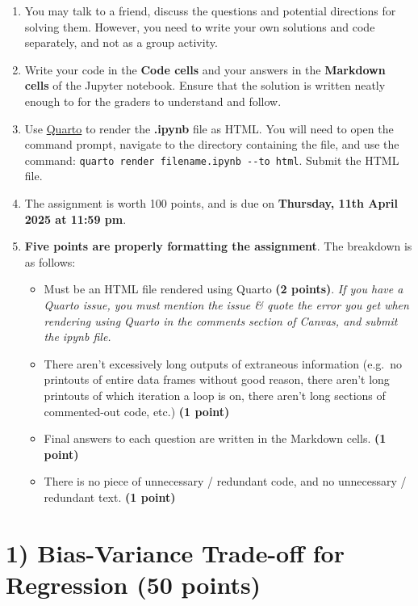 \documentclass[
  letterpaper,
  DIV=11,
  numbers=noendperiod]{scrreprt}
\providecommand{\tightlist}{%
  \setlength{\itemsep}{0pt}\setlength{\parskip}{0pt}}\usepackage{longtable,booktabs,array}
\begin{document}
\begin{enumerate}
\def\labelenumi{\arabic{enumi}.}
\item
  You may talk to a friend, discuss the questions and potential
  directions for solving them. However, you need to write your own
  solutions and code separately, and not as a group activity.
\item
  Write your code in the \textbf{Code cells} and your answers in the
  \textbf{Markdown cells} of the Jupyter notebook. Ensure that the
  solution is written neatly enough to for the graders to understand and
  follow.
\item
  Use
  \href{https://quarto.org/docs/output-formats/html-basics.html}{Quarto}
  to render the \textbf{.ipynb} file as HTML. You will need to open the
  command prompt, navigate to the directory containing the file, and use
  the command: \texttt{quarto\ render\ filename.ipynb\ -\/-to\ html}.
  Submit the HTML file.
\item
  The assignment is worth 100 points, and is due on \textbf{Thursday,
  11th April 2025 at 11:59 pm}.
\item
  \textbf{Five points are properly formatting the assignment}. The
  breakdown is as follows:

  \begin{itemize}
  \tightlist
  \item
    Must be an HTML file rendered using Quarto \textbf{(2 points)}.
    \emph{If you have a Quarto issue, you must mention the issue \&
    quote the error you get when rendering using Quarto in the comments
    section of Canvas, and submit the ipynb file.}
  \item
    There aren't excessively long outputs of extraneous information
    (e.g.~no printouts of entire data frames without good reason, there
    aren't long printouts of which iteration a loop is on, there aren't
    long sections of commented-out code, etc.) \textbf{(1 point)}
  \item
    Final answers to each question are written in the Markdown cells.
    \textbf{(1 point)}
  \item
    There is no piece of unnecessary / redundant code, and no
    unnecessary / redundant text. \textbf{(1 point)}
  \end{itemize}
\end{enumerate}

\section{\texorpdfstring{1) Bias-Variance Trade-off for Regression
\textbf{(50
points)}}{1) Bias-Variance Trade-off for Regression (50 points)}}\label{bias-variance-trade-off-for-regression-50-points}
\end{document}
